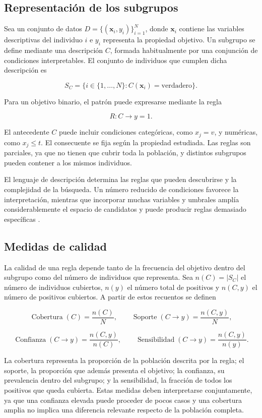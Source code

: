 \subsection{Representación de los subgrupos}

Sea un conjunto de datos $D=\{(\mathbf{x}_i,y_i)\}_{i=1}^{N}$, donde $\mathbf{x}_i$ contiene las variables descriptivas del individuo $i$ e $y_i$ representa la propiedad objetivo. Un subgrupo se define mediante una descripción $C$, formada habitualmente por una conjunción de condiciones interpretables. El conjunto de individuos que cumplen dicha descripción es

\[
S_C =
\{i \in \{1,\ldots,N\}:C(\mathbf{x}_i)=\mathrm{verdadero}\}.
\]

Para un objetivo binario, el patrón puede expresarse mediante la regla

\[
R:C\rightarrow y=1.
\]

El antecedente $C$ puede incluir condiciones categóricas, como $x_j=v$, y numéricas, como $x_j\leq t$. El consecuente se fija según la propiedad estudiada. Las reglas son parciales, ya que no tienen que cubrir toda la población, y distintos subgrupos pueden contener a los mismos individuos.

El lenguaje de descripción determina las reglas que pueden descubrirse y la complejidad de la búsqueda. Un número reducido de condiciones favorece la interpretación, mientras que incorporar muchas variables y umbrales amplía considerablemente el espacio de candidatos y puede producir reglas demasiado específicas \cite{Herrera2011,Atzmueller2015}.

\subsection{Medidas de calidad}

La calidad de una regla depende tanto de la frecuencia del objetivo dentro del subgrupo como del número de individuos que representa. Sea $n(C)=|S_C|$ el número de individuos cubiertos, $n(y)$ el número total de positivos y $n(C,y)$ el número de positivos cubiertos. A partir de estos recuentos se definen

\[
\operatorname{Cobertura}(C)=\frac{n(C)}{N},
\qquad
\operatorname{Soporte}(C\rightarrow y)=\frac{n(C,y)}{N},
\]

\[
\operatorname{Confianza}(C\rightarrow y)=\frac{n(C,y)}{n(C)},
\qquad
\operatorname{Sensibilidad}(C\rightarrow y)=\frac{n(C,y)}{n(y)}.
\]

La cobertura representa la proporción de la población descrita por la regla; el soporte, la proporción que además presenta el objetivo; la confianza, su prevalencia dentro del subgrupo; y la sensibilidad, la fracción de todos los positivos que queda cubierta. Estas medidas deben interpretarse conjuntamente, ya que una confianza elevada puede proceder de pocos casos y una cobertura amplia no implica una diferencia relevante respecto de la población completa.

